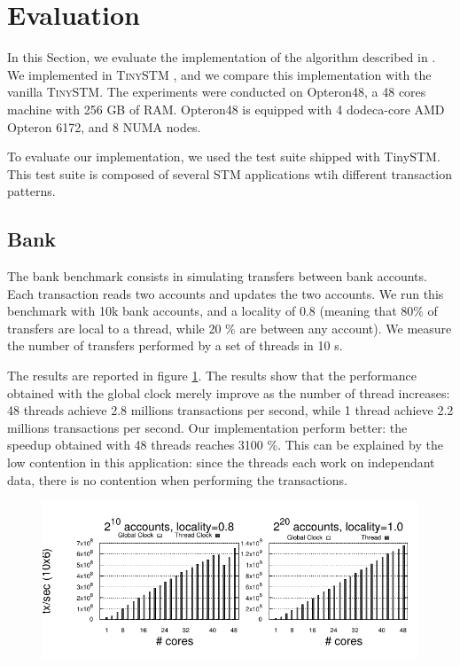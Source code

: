 \section{Evaluation}


In this Section, we evaluate the implementation of the algorithm
described in .  We implemented  in
\textsc{TinySTM} \cite{FelberFMR10}, and we compare this implementation
with the vanilla \textsc{TinySTM}.
%
The experiments were conducted on Opteron48, a 48 cores machine with
256 GB of RAM. Opteron48 is equipped with 4 dodeca-core AMD Opteron
6172, and 8 NUMA nodes.

To evaluate our implementation, we used the test suite shipped with
TinySTM. This test suite is composed of several STM applications wtih
different transaction patterns.

\subsection{Bank}

The bank benchmark consists in simulating transfers between bank
accounts. Each transaction reads two accounts and updates the two
accounts. We run this benchmark with 10k bank accounts, and a locality
of 0.8 (meaning that 80\% of transfers are local to a thread, while 20
\% are between any account). We measure the number of transfers
performed by a set of threads in 10 s.

The results are reported in figure \ref{fig:benchmarking:bank}.
%
The results show that the performance obtained with the global clock
merely improve as the number of thread increases: 48 threads achieve 2.8
millions transactions per second, while 1 thread achieve 2.2 millions
transactions per second.
%
Our implementation perform better: the speedup obtained with 48
threads reaches 3100 \%. This can be explained by the low contention
in this application: since the threads each work on independant data,
there is no contention when performing the transactions.

\begin{figure}[!t]
	\centering
	\includegraphics[scale = 1.0]{results/intset/bank.pdf}
	\caption{\label{fig:benchmarking:bank}}
\end{figure}

